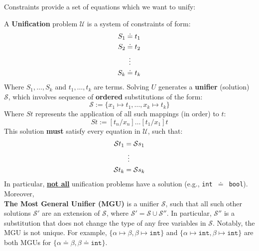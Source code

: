 \noindent
Constraints provide a set of equations which we want to unify:
\begin{Def}

    A \textbf{Unification} problem $\mathcal{U}$ is a system of constraints of form:
    \begin{align*}
        S_1 &\doteq t_1 \\
        S_2 &\doteq t_2 \\
        &\hspace{.5em}\vdots \\
        S_k &\doteq t_k
    \end{align*}
    \noindent
    Where $S_1, \ldots, S_k$ and $t_1, \ldots, t_k$ are terms. Solving $U$ generates a \textbf{unifier} (solution) $\mathcal{S}$, which involves
    sequence of \textbf{ordered} substitutions of the form:
    \[ \mathcal{S} := \{x_1 \mapsto t_1, \ldots, x_k \mapsto t_k\} \]
    \noindent
    Where $St$ represents the application of all such mappings (in order) to $t$:
    \[St:= [t_n/x_n] \ldots [t_1/x_1]t\]
    This solution \textbf{must} satisfy every equation in $\mathcal{U}$, such that:
    \begin{align*}
        \mathcal{S}t_1 &= \mathcal{S}s_1 \\
        &\hspace{.5em}\vdots \\
        \mathcal{S}t_k &= \mathcal{S}s_k
    \end{align*}
    \noindent
    In particular, \underline{\textbf{not all}} unification problems have a solution (e.g., \texttt{int }$\doteq$\texttt{ bool}). Moreover,\\
    \textbf{The Most General Unifier (MGU)} is a unifier $\mathcal{S}$, such that all such other solutions $\mathcal{S}'$ are an extension of $\mathcal{S}$, where
    $\mathcal{S}' = \mathcal{S} \cup \mathcal{S}''$.
    In particular, $\mathcal{S}''$ is a substitution that does not change the type of any free variables in $\mathcal{S}$. Notably, the MGU is not unique. For example, $\{\alpha \mapsto \beta, \beta \mapsto \texttt{int}\}$ and $\{\alpha \mapsto \texttt{int}, \beta \mapsto \texttt{int}\}$ 
    are both MGUs for $\{\alpha \doteq \beta, \beta\doteq\texttt{int}\}$.\\
    

\end{Def}
